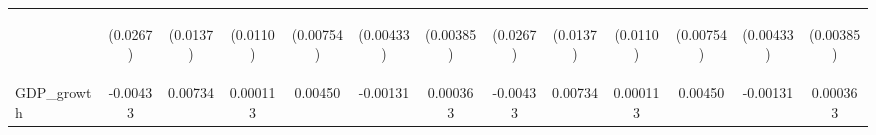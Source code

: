 \documentclass[]{article}
\begin{document}
\begin{center}
\begin{tabular}{lcccccccccccc}
\vspace{4pt} & \begin{footnotesize}(0.0267)\end{footnotesize} & \begin{footnotesize}(0.0137)\end{footnotesize} & \begin{footnotesize}(0.0110)\end{footnotesize} & \begin{footnotesize}(0.00754)\end{footnotesize} & \begin{footnotesize}(0.00433)\end{footnotesize} & \begin{footnotesize}(0.00385)\end{footnotesize} & \begin{footnotesize}(0.0267)\end{footnotesize} & \begin{footnotesize}(0.0137)\end{footnotesize} & \begin{footnotesize}(0.0110)\end{footnotesize} & \begin{footnotesize}(0.00754)\end{footnotesize} & \begin{footnotesize}(0.00433)\end{footnotesize} & \begin{footnotesize}(0.00385)\end{footnotesize} \\
GDP\_growth & -0.00433 & 0.00734 & 0.000113 & 0.00450 & -0.00131 & 0.000363 & -0.00433 & 0.00734 & 0.000113 & 0.00450 & -0.00131 & 0.000363 \\

\end{tabular}
\end{center}
\end{document}
